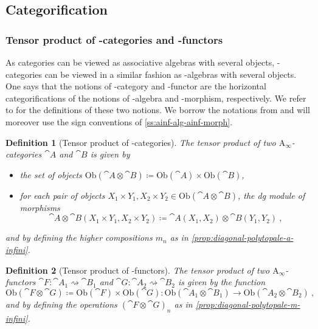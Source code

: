 \documentclass[10pt]{amsart}
\newtheorem{definition}{Definition}[section]
\theoremstyle{remark}
\begin{document}
\subsection{Categorification}

\subsubsection{Tensor product of \Ainf -categories and \Ainf -functors}

As categories can be viewed as associative algebras with several objects, \Ainf -categories can be viewed in a similar fashion as \Ainf -algebras with several objects. One says that the notions of \Ainf -category and \Ainf -functor are the horizontal categorifications of the notions of \Ainf -algebra and \Ainf -morphism, respectively. 
We refer to \cite[Chapter 1]{Seidel08} for the definitions of these two notions. 
We borrow the notations from \cite{Seidel08} and will moreover use the sign conventions of \cref{ss:ainf-alg-ainf-morph}. 

\begin{definition}[Tensor product of \Ainf -categories] \label{def:tensor-product-ainf-cat}
The \emph{tensor product} of two $\mathrm{A}_\infty$-categories $\cat{A}$ and $\cat{B}$ is given by 
\begin{itemize}[leftmargin=*]
  \item the set of objects $\mathrm{Ob}(\cat{A}\otimes \cat{B})\coloneqq \mathrm{Ob}(\cat{A})\times\mathrm{Ob}(\cat{B})$,
  \item for each pair of objects $X_1\times Y_1,X_2\times Y_2 \in \mathrm{Ob}(\cat{A}\otimes \cat{B})$, the dg module of morphisms \[\cat{A}\otimes \cat{B}(X_1\times Y_1,X_2\times Y_2)\coloneqq \cat{A}(X_1,X_2)\otimes\cat{B}(Y_1,Y_2) \ , \]
\end{itemize}
and by defining the higher compositions $m_n$ as in \cref{prop:diagonal-polytopale-a-infini}.
\end{definition}

\begin{samepage}
\begin{definition}[Tensor product of \Ainf -functors]
The \emph{tensor product} of two $\mathrm{A}_\infty$-functors $\cat{F}:\cat{A}_1 \rightsquigarrow \cat{B}_1$ and $\cat{G}:\cat{A}_2 \rightsquigarrow \cat{B}_2$ is given by the function 
\[ \mathrm{Ob}(\cat{F}\otimes \cat{G})\coloneqq \mathrm{Ob}(\cat{F})\times \mathrm{Ob}(\cat{G}) : \mathrm{Ob}(\cat{A}_1\otimes\cat{B}_1) \to \mathrm{Ob}(\cat{A}_2\otimes\cat{B}_2) \ , \]
and by defining the operations $(\cat{F} \otimes \cat{G})_n$ as in \cref{prop:diagonal-polytopale-m-infini}.
\end{definition}
\end{samepage}
\end{document}
